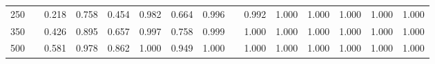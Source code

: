 % 
\begin{tabular}{ccccccccccccccc}
  \hline
  \hline
250 &  & 0.218 & 0.758 & 0.454 & 0.982 & 0.664 & 0.996 &  & 0.992 & 1.000 & 1.000 & 1.000 & 1.000 & 1.000 \\ 
  350 &  & 0.426 & 0.895 & 0.657 & 0.997 & 0.758 & 0.999 &  & 1.000 & 1.000 & 1.000 & 1.000 & 1.000 & 1.000 \\ 
  500 &  & 0.581 & 0.978 & 0.862 & 1.000 & 0.949 & 1.000 &  & 1.000 & 1.000 & 1.000 & 1.000 & 1.000 & 1.000 \\ 
   \hline
\end{tabular}
